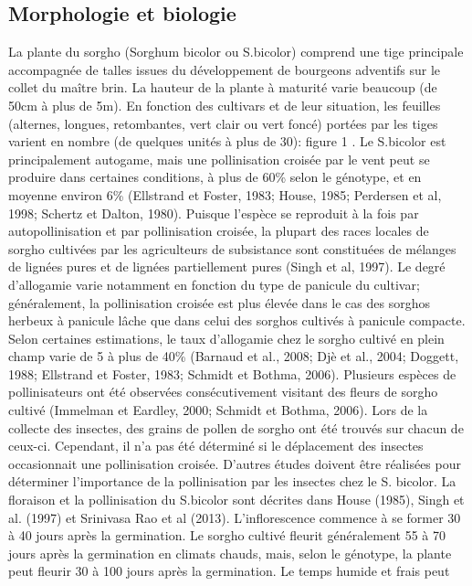 \documentclass[a4paper,11pt]{article}
\begin{document}
 
\subsection{Morphologie et biologie} La plante du sorgho
(Sorghum bicolor ou S.bicolor) comprend une tige principale
accompagnée de talles issues du développement de bourgeons
adventifs sur le collet du maître brin. La hauteur de la plante à
maturité varie beaucoup (de 50cm à plus de 5m). En fonction des
cultivars et de leur situation, les feuilles (alternes, longues,
retombantes, vert clair ou vert foncé) portées par les tiges
varient en nombre (de quelques unités à plus de 30): figure 1
\cite{BARRO_KONDOMBO_2010}. Le S.bicolor est principalement autogame, mais une
pollinisation croisée par le vent peut se produire dans certaines
conditions, à plus de 60\% selon le génotype, et en moyenne
environ 6\% (Ellstrand et Foster, 1983; House, 1985; Perdersen et
al, 1998; Schertz et Dalton, 1980). Puisque l’espèce se reproduit
à la fois par autopollinisation et par pollinisation croisée, la
plupart des races locales de sorgho cultivées par les
agriculteurs de subsistance sont constituées de mélanges de
lignées pures et de lignées partiellement pures (Singh et al,
1997). Le degré d’allogamie varie notamment en fonction du type
de panicule du cultivar; généralement, la pollinisation croisée
est plus élevée dans le cas des sorghos herbeux à panicule lâche
que dans celui des sorghos cultivés à panicule compacte. Selon
certaines estimations, le taux d’allogamie chez le sorgho cultivé
en plein champ varie de 5 à plus de 40\% (Barnaud et al., 2008;
Djè et al., 2004; Doggett, 1988; Ellstrand et Foster, 1983;
Schmidt et Bothma, 2006). Plusieurs espèces de pollinisateurs ont
été observées consécutivement visitant des fleurs de sorgho
cultivé (Immelman et Eardley, 2000; Schmidt et Bothma,
2006). Lors de la collecte des insectes, des grains de pollen de
sorgho ont été trouvés sur chacun de ceux-ci. Cependant, il n’a
pas été déterminé si le déplacement des insectes occasionnait une
pollinisation croisée. D’autres études doivent être réalisées
pour déterminer l’importance de la pollinisation par les insectes
chez le S. bicolor. La floraison et la pollinisation du S.bicolor
sont décrites dans House (1985), Singh et al. (1997) et Srinivasa
Rao et al (2013). L’inflorescence commence à se former 30 à 40
jours après la germination. Le sorgho cultivé fleurit
généralement 55 à 70 jours après la germination en climats
chauds, mais, selon le génotype, la plante peut fleurir 30 à 100
jours après la germination. Le temps humide et frais peut
\end{document}
